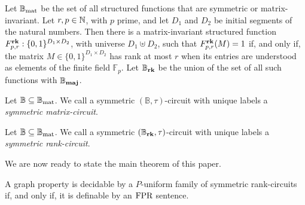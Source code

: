 \documentclass[../paper.tex]{subfiles}
\begin{document}

Let $\mathbb{B}_{\text{mat}}$ be the set of all structured functions that are symmetric or
matrix-invariant. Let $r, p \in \mathbb{N}$, with $p$ prime, and let $D_1$ and $D_2$
be initial segments of the natural numbers. Then there is a matrix-invariant
structured function $F^{\text{\textbf{rk}}}_{p,r}: \{0,1\}^{D_1 \times D_2}$, with universe
$D_1 \uplus D_2$, such that $F^{\text{\textbf{rk}}}_{p,r}(M) = 1$ if, and only if, the matrix
$M \in \{0,1\}^{D_1 \times D_2}$ has rank at most $r$ when its entries are
understood as elements of the finite field $\mathbb{F}_p$. Let
$\mathbb{B}_{\text{\textbf{rk}}}$ be the union of the set of all such functions with
$\mathbb{B}_{\text{\textbf{maj}}}$.

\begin{definition}
  Let $\mathbb{B} \subseteq \mathbb{B}_{\text{mat}}$. We call a symmetric $(\mathbb{B},
  \tau)$-circuit with unique labels a \emph{symmetric matrix-circuit}.
\end{definition}

\begin{definition}
  Let $\mathbb{B} \subseteq \mathbb{B}_{\text{mat}}$. We call a symmetric $(\mathbb{B}_{\text{\textbf{rk}}},
  \tau)$-circuit with unique labels a \emph{symmetric rank-circuit}.
\end{definition}


We are now ready to state the main theorem of this paper.

\begin{thm}
  A graph property is decidable by a $P$-uniform family of symmetric
  rank-circuits if, and only if, it is definable by an $\text{\upshape FPR}$ sentence.
\end{thm}
\end{document}
